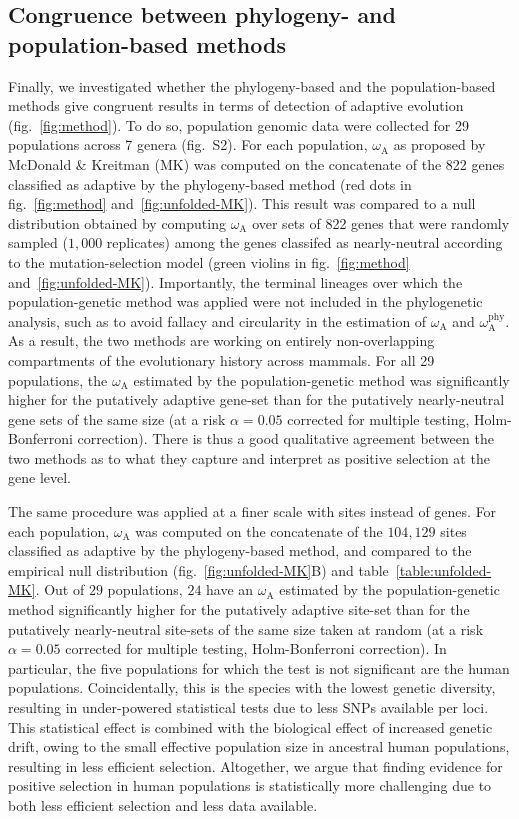\documentclass[9pt,twocolumn,twoside,lineno]{pnas-new}
\newcommand{\rateApop}{\omega_{\mathrm{A}}}
\newcommand{\rateAphy}{\rateApop^{\mathrm{phy}}}
\begin{document}
\subsection*{Congruence between phylogeny- and population-based methods}
Finally, we investigated whether the phylogeny-based and the population-based methods give congruent results in terms of detection of adaptive evolution (fig.~\ref{fig:method}).
To do so, population genomic data were collected for 29 populations across 7 genera (fig.~S2).
For each population, $\rateApop$ as proposed by McDonald \& Kreitman (MK)\cite{mcdonald_adaptative_1991} was computed on the concatenate of the 822 genes classified as adaptive by the phylogeny-based method (red dots in fig.~\ref{fig:method} and~\ref{fig:unfolded-MK}).
This result was compared to a null distribution obtained by computing $\rateApop$ over sets of 822 genes that were randomly sampled ($1,000$ replicates) among the genes classifed as nearly-neutral according to the mutation-selection model (green violins in fig.~\ref{fig:method} and~\ref{fig:unfolded-MK}).
Importantly, the terminal lineages over which the population-genetic method was applied were not included in the phylogenetic analysis, such as to avoid fallacy and circularity in the estimation of $\rateApop$ and $\rateAphy$.
As a result, the two methods are working on entirely non-overlapping compartments of the evolutionary history across mammals.
For all 29 populations, the $\rateApop$ estimated by the population-genetic method was significantly higher for the putatively adaptive gene-set than for the putatively nearly-neutral gene sets of the same size (at a risk $\alpha=0.05$ corrected for multiple testing, Holm-Bonferroni correction).
There is thus a good qualitative agreement between the two methods as to what they capture and interpret as positive selection at the gene level.

The same procedure was applied at a finer scale with sites instead of genes.
For each population, $\rateApop$ was computed on the concatenate of the $104,129$ sites classified as adaptive by the phylogeny-based method, and compared to the empirical null distribution (fig.~\ref{fig:unfolded-MK}B) and table~\ref{table:unfolded-MK}.
Out of $29$ populations, $24$ have an $\rateApop$ estimated by the population-genetic method significantly higher for the putatively adaptive site-set than for the putatively nearly-neutral site-sets of the same size taken at random (at a risk $\alpha=0.05$ corrected for multiple testing, Holm-Bonferroni correction).
In particular, the five populations for which the test is not significant are the human populations.
Coincidentally, this is the species with the lowest genetic diversity, resulting in under-powered statistical tests due to less SNPs available per loci.
This statistical effect is combined with the biological effect of increased genetic drift, owing to the small effective population size in ancestral human populations, resulting in less efficient selection.
Altogether, we argue that finding evidence for positive selection in human populations is statistically more challenging due to both less efficient selection and less data available.
\end{document}
